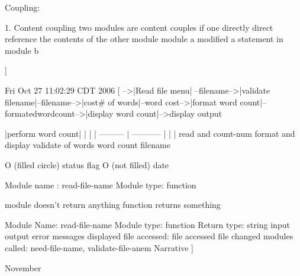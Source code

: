 \documentclass[a4paper]{article}
\begin{document}
{Coupling:
	
	1.  Content coupling
			two modules are content
			couples if one directly
			direct reference the contents of the other module
			module a modified a statement in module b

]


Fri Oct 27 11:02:29 CDT 2006
[
-->|Read file menu| --filename-->|validate filename|--filename-->|cost# of words|--word cost-->|format word count|--formatedwordcount-->|display word count|-->display output

				|perform word count|
				   |    |      |
		   ---------    |      -----------
		   |            |                |
		  read and   count-num			format and display 
		  validate	 of words			word count
		  filename

O (filled circle) status flag
O  (not filled) date

Module name : read-file-name
Module type:  function

module doesn't return anything
function returns something

Module Name:	read-file-name
Module type:	function
Return type:	string
input 
output
error messages displayed
file accessed:
file accessed
file changed
modules called: need-file-name, validate-file-anem
Narrative
]
}
November
\end{document}

